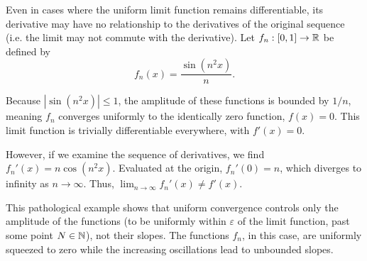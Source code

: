 \documentclass[../analysis1.tex]{subfiles}
\begin{document}
\begin{example}
    Even in cases where the uniform limit function remains differentiable, its derivative may have no relationship to the derivatives of the original sequence (i.e. the limit may not commute with the derivative). Let $f_n:[0,1] \to \mathbb{R}$ be defined by
    \[
        f_n(x) = \frac{\sin(n^2 x)}{n}.
    \]

    \begin{center}
    \end{center}

    Because $|\sin(n^2 x)| \le 1$, the amplitude of these functions is bounded by $1/n$, meaning $f_n$ converges uniformly to the identically zero function, $f(x) = 0$. This limit function is trivially differentiable everywhere, with $f'(x) = 0$.
    
    However, if we examine the sequence of derivatives, we find $f_n'(x) = n \cos(n^2 x)$. Evaluated at the origin, $f_n'(0) = n$, which diverges to infinity as $n \to \infty$. Thus, $\lim_{n \to \infty} f_n'(x) \neq f'(x)$. 
    
    This pathological example shows that uniform convergence controls only the amplitude of the functions (to be uniformly within $\varepsilon$ of the limit function, past some point $N\in\mathbb{N}$), not their slopes. The functions $f_n$, in this case, are uniformly squeezed to zero while the increasing oscillations lead to unbounded slopes.
\end{example}
\end{document}
